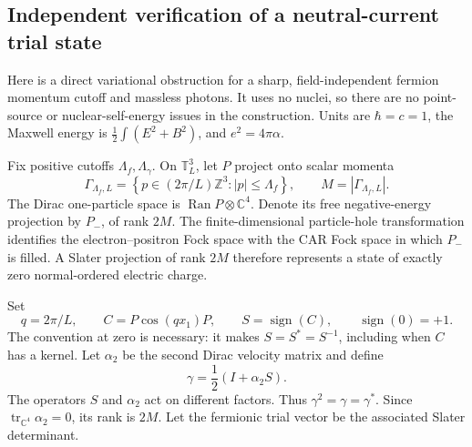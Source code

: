 \subsection{Independent verification of a neutral-current trial state}
\label{app-qed:trial}

Here is a direct variational obstruction for a sharp, field-independent fermion momentum cutoff and massless photons. It uses no nuclei, so there are no point-source or nuclear-self-energy issues in the construction. Units are \(\hbar=c=1\), the Maxwell energy is \(\frac12\int(E^2+B^2)\), and \(e^2=4\pi\alpha\).

Fix positive cutoffs \(\Lambda_f,\Lambda_\gamma\). On \(\mathbb T_L^3\), let \(P\) project onto scalar momenta
\[
 \Gamma_{\Lambda_f,L}
 =\left\{p\in(2\pi/L)\mathbb Z^3:|p|\leq\Lambda_f\right\},
 \qquad M=|\Gamma_{\Lambda_f,L}|.
\]
The Dirac one-particle space is \(\operatorname{Ran}P\otimes\mathbb C^4\). Denote its free negative-energy projection by \(P_-\), of rank \(2M\). The finite-dimensional particle-hole transformation identifies the electron--positron Fock space with the CAR Fock space in which \(P_-\) is filled. A Slater projection of rank \(2M\) therefore represents a state of exactly zero normal-ordered electric charge.

Set
\[
 q=2\pi/L,\qquad C=P\cos(qx_1)P,
 \qquad S=\operatorname{sign}(C),
 \qquad\operatorname{sign}(0)=+1.
\]
The convention at zero is necessary: it makes \(S=S^*=S^{-1}\), including when \(C\) has a kernel. Let \(\alpha_2\) be the second Dirac velocity matrix and define
\begin{equation}
 \gamma=\frac12(I+\alpha_2 S).
 \label{app-qed:gamma}
\end{equation}
The operators \(S\) and \(\alpha_2\) act on different factors. Thus \(\gamma^2=\gamma=\gamma^*\). Since \(\operatorname{tr}_{\mathbb C^4}\alpha_2=0\), its rank is \(2M\). Let the fermionic trial vector be the associated Slater determinant.

